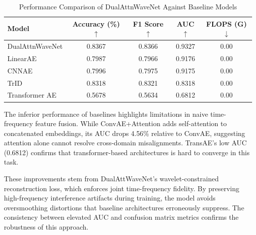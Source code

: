 \documentclass[12pt]{article}
\begin{document}
\begin{table}[htbp]
    \caption{Performance Comparison of DualAttnWaveNet Against Baseline Models}
    \label{tab:main_results}
    \centering
    \begin{tabular}{lcccc}
        \toprule
        \textbf{Model}  & \textbf{Accuracy (\%) } $\uparrow$ & \textbf{F1 Score} $\uparrow$ & \textbf{AUC}$\uparrow$ & \textbf{FLOPS (G)}$\downarrow$ \\
        \midrule
        DualAttnWaveNet & 0.8367                             & 0.8366                       & 0.9327                 & 0.00                           \\
        \cmidrule{1-5}
        LinearAE        & 0.7987                             & 0.7966                       & 0.9176                 & 0.00                           \\
        CNNAE           & 0.7996                             & 0.7975                       & 0.9175                 & 0.00                           \\
        TrID            & 0.8318                             & 0.8321                       & 0.8318                 & 0.00                           \\
        Transformer AE  & 0.5678                             & 0.5634                       & 0.6812                 & 0.00                           \\
        \bottomrule
    \end{tabular}
\end{table}

The inferior performance of baselines highlights limitations in naive time-frequency feature fusion. While ConvAE+Attention adds self-attention to concatenated embeddings, its AUC drops 4.56\% relative to ConvAE, suggesting attention alone cannot resolve cross-domain misalignments. TransAE’s low AUC (0.6812) confirms that transformer-based architectures is hard to converge in this task.



These improvements stem from DualAttWaveNet’s wavelet-constrained reconstruction loss, which enforces joint time-frequency fidelity. By preserving high-frequency interference artifacts during training, the model avoids oversmoothing distortions that baseline architectures erroneously suppress. The consistency between elevated AUC and confusion matrix metrics confirms the robustness of this approach.
\end{document}
